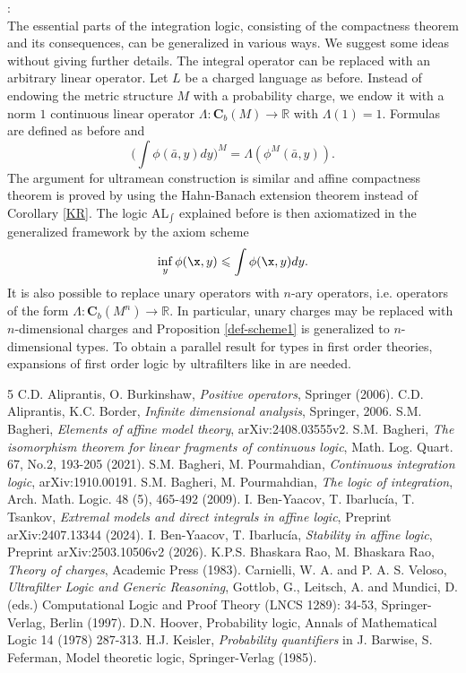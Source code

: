\documentclass[12pt]{article}
\def\a{\bar {a}}\def\b{\bar {b}}\def\c{\bar {c}}
\def\Rn{\mathbb R}
\begin{document}
:\\
The essential parts of the integration logic, consisting of the compactness theorem and its consequences,
can be generalized in various ways. We suggest some ideas without giving further details.
The integral operator can be replaced with an arbitrary linear operator.
Let $L$ be a charged language as before. Instead of endowing the metric structure $M$ with a probability charge,
we endow it with a norm $1$ continuous linear operator $\Lambda:\mathbf{C}_b(M)\rightarrow\Rn$ with $\Lambda(1)=1$.
Formulas are defined as before and $$\big(\int\phi(\a,y)dy\big)^M=\Lambda(\phi^M(\a,y)).$$
The argument for ultramean construction is similar and affine compactness theorem is proved by using
the Hahn-Banach extension theorem instead of Corollary \ref{KR}. The logic AL$_{\int}$ explained before is then axiomatized
in the generalized framework by the axiom scheme $$\inf_y\phi(\x,y)\leqslant\int\phi(\x,y)dy.$$
It is also possible to replace unary operators with $n$-ary operators, i.e. operators of the form $\Lambda:{\mathbf C}_b(M^n)\rightarrow\Rn$.
In particular, unary charges may be replaced with $n$-dimensional charges and Proposition \ref{def-scheme1} is generalized to $n$-dimensional types.
To obtain a parallel result for types in first order theories, expansions of first order logic by ultrafilters like in \cite{Veloso} are needed.


\begin{thebibliography}{5}
 C.D. Aliprantis, O. Burkinshaw, \textit{Positive operators}, Springer (2006).
 C.D. Aliprantis, K.C. Border, \textit{Infinite dimensional analysis}, Springer, 2006.
 S.M. Bagheri, \textit{Elements of affine model theory},  arXiv:2408.03555v2.
 S.M. Bagheri, \textit{The isomorphism theorem for linear fragments of continuous logic},
Math. Log. Quart. 67, No.2, 193-205 (2021).
 S.M. Bagheri, M. Pourmahdian, \textit{Continuous integration logic}, arXiv:1910.00191.
 S.M. Bagheri, M. Pourmahdian, \textit{The logic of integration}, Arch. Math. Logic. 48 (5), 465-492 (2009).
 I. Ben-Yaacov, T. Ibarluc\'{i}a, T. Tsankov,
\textit{Extremal models and direct integrals in affine logic}, Preprint arXiv:2407.13344 (2024).
 I. Ben-Yaacov, T. Ibarluc\'{i}a, \textit{Stability in affine logic}, Preprint arXiv:2503.10506v2 (2026).
 K.P.S. Bhaskara Rao, M. Bhaskara Rao, \textit{Theory of charges}, Academic Press (1983).
 Carnielli, W. A. and P. A. S. Veloso, \textit{Ultrafilter Logic and Generic
Reasoning}, Gottlob, G., Leitsch, A. and Mundici, D. (eds.) Computational
Logic and Proof Theory (LNCS 1289): 34-53, Springer-Verlag, Berlin (1997).
 D.N. Hoover, Probability logic, Annals of Mathematical Logic 14 (1978) 287-313.
 H.J. Keisler, \emph{Probability quantifiers} in J. Barwise, S. Feferman, Model theoretic logic, Springer-Verlag (1985).
\end{thebibliography}
\end{document}
